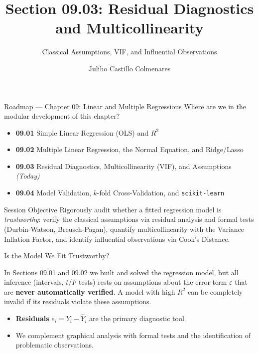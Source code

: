 \documentclass[10pt, aspectratio=169]{beamer}
\title[Regression Diagnostics]{Section 09.03: Residual Diagnostics and Multicollinearity}
\subtitle{Classical Assumptions, VIF, and Influential Observations}
\author[J. Castillo Colmenares]{Juliho Castillo Colmenares}
\institute{Tecnológico de Monterrey}
\date{\vspace{-1.5cm}}
\begin{document}
\begin{frame}[plain]
  \titlepage
\end{frame}

\begin{frame}{Roadmap --- Chapter 09: Linear and Multiple Regressions}
  \footnotesize
  Where are we in the modular development of this chapter? \pause
  \begin{itemize}\itemsep=0.08em
    \item \textbf{09.01} Simple Linear Regression (OLS) and $R^2$ \pause
    \item \textbf{09.02} Multiple Linear Regression, the Normal Equation, and Ridge/Lasso \pause
    \item \textbf{09.03} Residual Diagnostics, Multicollinearity (VIF), and Assumptions \emph{(Today)} \pause
    \item \textbf{09.04} Model Validation, $k$-fold Cross-Validation, and \texttt{scikit-learn}
  \end{itemize}
  \vspace{-0.05cm}
  \begin{block}{Session Objective}
    Rigorously audit whether a fitted regression model is \emph{trustworthy}: verify the classical assumptions via residual analysis and formal tests (Durbin-Watson, Breusch-Pagan), quantify multicollinearity with the Variance Inflation Factor, and identify influential observations via Cook's Distance.
  \end{block}
\end{frame}

\begin{frame}{Is the Model We Fit Trustworthy?}
  \footnotesize
  \begin{motivacion}
    In Sections 09.01 and 09.02 we built and solved the regression model, but all inference (intervals, $t$/$F$ tests) rests on assumptions about the error term $\varepsilon$ that are \textbf{never automatically verified}. A model with high $R^2$ can be completely invalid if its residuals violate these assumptions.
  \end{motivacion}

  \vspace{0.15cm}
  \pause
  \begin{itemize}\itemsep=0.1cm
    \item \textbf{Residuals} $e_i=Y_i-\hat Y_i$ are the primary diagnostic tool. \pause
    \item We complement graphical analysis with formal tests and the identification of problematic observations.
  \end{itemize}
\end{frame}
\end{document}
